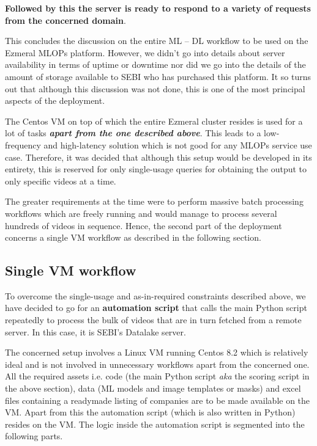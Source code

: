 \begin{enumerate}
        \textbf{Followed by this the server is ready to respond to a variety of requests from the concerned domain}.
\end{enumerate}

This concludes the discussion on the entire ML – DL workflow to be used on the Ezmeral MLOPs platform. However, we didn’t go into details about server availability in terms of uptime or downtime nor did we go into the details of the amount of storage available to SEBI who has purchased this platform. It so turns out that although this discussion was not done, this is one of the most principal aspects of the deployment. \par

The Centos VM on top of which the entire Ezmeral cluster resides is used for a lot of tasks \textbf{\textit{apart from the one described above}}. This leads to a low-frequency and high-latency solution which is not good for any MLOPs service use case. Therefore, it was decided that although this setup would be developed in its entirety, this is reserved for only single-usage queries for obtaining the output to only specific videos at a time. \par

The greater requirements at the time were to perform massive batch processing workflows which are freely running and would manage to process several hundreds of videos in sequence. Hence, the second part of the deployment concerns a single VM workflow as described in the following section.

\subsection{Single VM workflow} \label{vm}

To overcome the single-usage and as-in-required constraints described above, we have decided to go for an \textbf{automation script} that calls the main Python script repeatedly to process the bulk of videos that are in turn fetched from a remote server. In this case, it is SEBI’s Datalake server. \par

The concerned setup involves a Linux VM running Centos 8.2 which is relatively ideal and is not involved in unnecessary workflows apart from the concerned one. All the required assets i.e. code (the main Python script \textit{aka} the scoring script in the above section), data (ML models and image templates or masks) and excel files containing a readymade listing of companies are to be made available on the VM. Apart from this the automation script (which is also written in Python) resides on the VM. The logic inside the automation script is segmented into the following parts.


